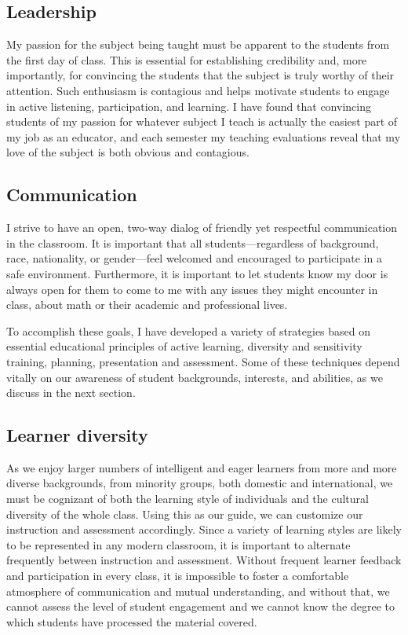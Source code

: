  \subsection{Leadership}
My passion for the subject being taught must be
apparent to the students from the first day of class. 
This is essential for establishing credibility and, more importantly,
for convincing the students that the subject is truly worthy of
their attention.
Such enthusiasm is contagious and helps motivate students to engage in
active listening, participation, and learning.
I have found that convincing students of my passion for
whatever subject I teach is actually the easiest part of my
job as an educator, and each semester my teaching evaluations reveal
that my love of the subject is both obvious and contagious.


\bigskip

\subsection{Communication}  I strive to have an open, two-way
dialog of friendly yet respectful communication in the classroom.
It is important that all students---regardless of background, race,
nationality, or gender---feel welcomed and encouraged to participate in a safe environment.
Furthermore, it is important to let students know my door is always
open for them to come to me with any issues they might encounter in
class, about math or their academic and professional lives.

To accomplish these goals, I have developed a variety of strategies
based on essential educational principles of active
learning, diversity and sensitivity training, planning,
presentation and assessment.
Some of these techniques depend vitally on our awareness of
student backgrounds, interests, and abilities, as we discuss in the
next section.


\bigskip

\subsection{Learner diversity}
As we enjoy larger numbers of intelligent and eager learners from
more and more diverse backgrounds, from minority groups, both domestic and 
international, we must be cognizant of 
both the learning style of individuals and the
cultural diversity of the whole class. Using this as our guide,
we can customize our instruction and assessment accordingly.
Since a variety of learning styles are likely
to be represented in any modern classroom,
it is important to alternate frequently between instruction and
assessment.
Without frequent learner feedback and participation in every class,
it is impossible to foster a comfortable atmosphere of 
communication and mutual understanding, and without that, we cannot
assess the level of student engagement and we cannot know the degree
to which students have processed the material covered.


